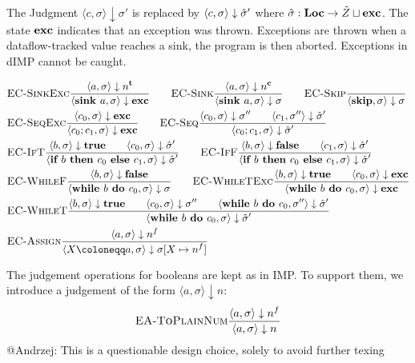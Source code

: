 The Judgment $\langle c, \sigma \rangle \downarrow \sigma'$ is replaced by 
$\langle c, \sigma \rangle \downarrow \hat{\sigma}'$
where $\hat{\sigma}{}: \textbf{Loc} \to \tilde{Z} \sqcup \textbf{exc}$.
The state $\textbf{exc}$ indicates that an exception was thrown.
Exceptions are thrown when a dataflow-tracked value reaches a sink, the program
is then aborted.
Exceptions in dIMP cannot be caught.

\begin{align*}
    &\bsrule{EC-SinkExc}{\bigstep{a}{\store}{\tracked{}}}
    {\bigstep{\defaultsink}{\store}{\exception}} \qquad
    \bsrule{EC-Sink}{\bigstep{a}{\store}{\clean{}}}
    {\bigstep{\defaultsink}{\store}{\store}} \qquad
    \bsrule{EC-Skip}{}{\bigstep{\skipcmd}{\store}{\store}}\\
    &\bsrule{EC-SeqExc}{\bigstep{c_0}{\sigma}{\exception}}
    {\bigstep{\defaultseq}{\store}{\exception}} \qquad
    \bsrule{EC-Seq}{\bigstep{c_0}{\sigma}{\store''} \qquad \bigstep{c_1}{\store''}{\excstore'}}
    {\bigstep{\defaultseq}{\store}{\excstore'}}\\
    &\bsrule{EC-IfT}{\bigstep{b}{\store}{\btrue}\qquad \bigstep{c_0}{\store}{\excstore'}}
    {\bigstep{\defaultif}{\store}{\excstore'}} \qquad
    \bsrule{EC-IfF}{\bigstep{b}{\store}{\bfalse}\qquad \bigstep{c_1}{\store}{\excstore'}}
    {\bigstep{\defaultif}{\store}{\excstore'}}\\
    &\bsrule{EC-WhileF}{\bigstep{b}{\sigma}{\bfalse}}
    {\bigstep{\defaultwhile}{\store}{\store}} \qquad
    \bsrule{EC-WhileTExc}{\bigstep{b}{\sigma}{\btrue} \qquad \bigstep{c_0}{\store}{\exception}}
    {\bigstep{\defaultwhile}{\store}{\exception}}\\
    &\bsrule{EC-WhileT}{\bigstep{b}{\sigma}{\btrue} \qquad \bigstep{c_0}{\store}{\store''}\qquad
    \bigstep{\defaultwhile}{\store''}{\excstore'}}
    {\bigstep{\defaultwhile}{\store}{\excstore'}}\\
    &\bsrule{EC-Assign}{\bigstep{a}{\store}{\flagged{}}}
    {\bigstep{\defaultstore}{\store}{\store{}[X \mapsto \flagged{}]}}
\end{align*}

The judgement operations for booleans are kept as in IMP.
To support them, we introduce a judgement of the form
$\langle a, \sigma \rangle \downarrow n$:
\begin{align*}
    \textsc{EA-ToPlainNum}\frac{\displaystyle \langle a, \sigma \rangle \downarrow n^f{}}{\displaystyle \langle a, \sigma \rangle \downarrow n}
\end{align*}
{\color{red} @Andrzej: This is a questionable design choice,
 solely to avoid further texing}

